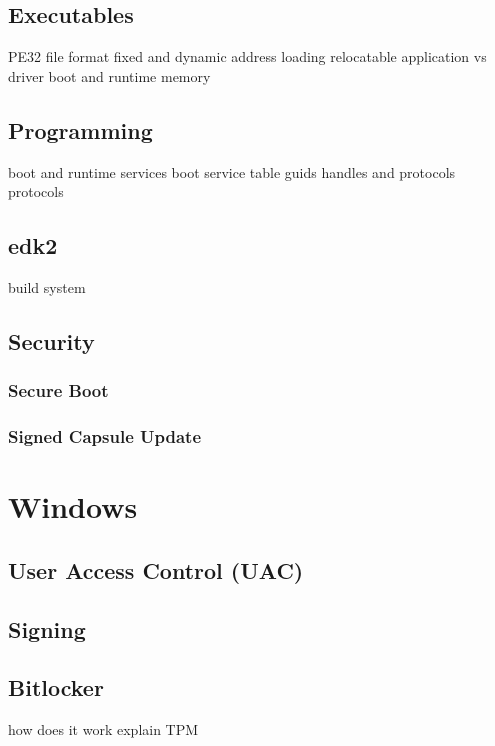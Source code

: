 \subsection{Executables}
PE32 file format
fixed and dynamic address loading
relocatable
application vs driver
boot and runtime memory

\subsection{Programming}
boot and runtime services
boot service table
guids
handles and protocols
protocols

\subsection{edk2}
build system

\subsection{Security}
\subsubsection{Secure Boot}
\subsubsection{Signed Capsule Update}

\section{Windows}
\subsection{User Access Control (UAC)}
\subsection{Signing}
\subsection{Bitlocker}
how does it work
explain TPM




